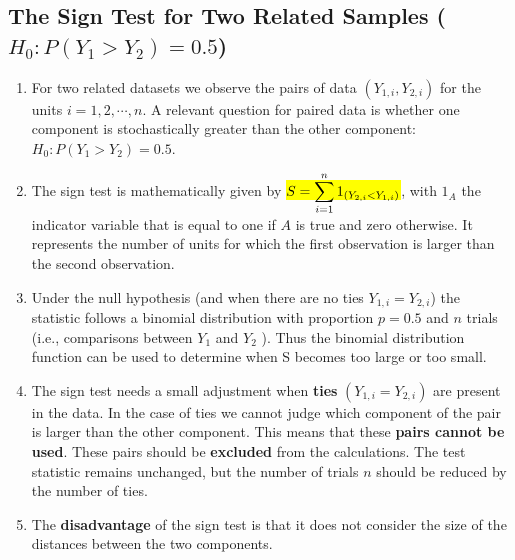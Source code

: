 \subsection{The Sign Test for Two Related Samples ($H_0 : P(Y_1 > Y_2) = 0.5$)}

\begin{enumerate}
    \item For two related datasets we observe the pairs of data $(Y_{1,i} , Y_{2,i} )$ for the units $i = 1, 2, \cdots , n$. 
    A relevant question for paired data is whether one component is stochastically greater than the other component: $H_0 : P(Y_1 > Y_2) = 0.5$.
    \hfill \cite{statistics/book/Statistics-for-Data-Scientists/Maurits-Kaptein}

    \item The sign test is mathematically given by \colorbox{yellow}{$S = \displaystyle\sum^n _{i=1} 1_{(Y_{2,i} <Y_{1,i} )}$}, with $1_A$ the indicator variable that is equal to one if $A$ is true and zero otherwise. 
    It represents the number of units for which the first observation is larger than the second observation.
    \hfill \cite{statistics/book/Statistics-for-Data-Scientists/Maurits-Kaptein}

    \item Under the null hypothesis (and when there are no ties $Y_{1,i} = Y_{2,i} $) the statistic follows a binomial distribution with proportion $p = 0.5$ and $n$ trials (i.e., comparisons between $Y_1$ and $Y_2$ ). 
    Thus the binomial distribution function can be used to determine when S becomes too large or too small. 
    \hfill \cite{statistics/book/Statistics-for-Data-Scientists/Maurits-Kaptein}

    \item The sign test needs a small adjustment when \textbf{ties} $(Y_{1,i} = Y_{2,i} )$ are present in the data. 
    In the case of ties we cannot judge which component of the pair is larger than the other component. 
    This means that these \textbf{pairs cannot be used}. 
    These pairs should be \textbf{excluded} from the calculations.  
    The test statistic remains unchanged, but the number of trials $n$ should be reduced by the number of ties.
    \hfill \cite{statistics/book/Statistics-for-Data-Scientists/Maurits-Kaptein}

    \item The \textbf{disadvantage} of the sign test is that it does not consider the size of the distances between the two components.
    \hfill \cite{statistics/book/Statistics-for-Data-Scientists/Maurits-Kaptein}
\end{enumerate}



